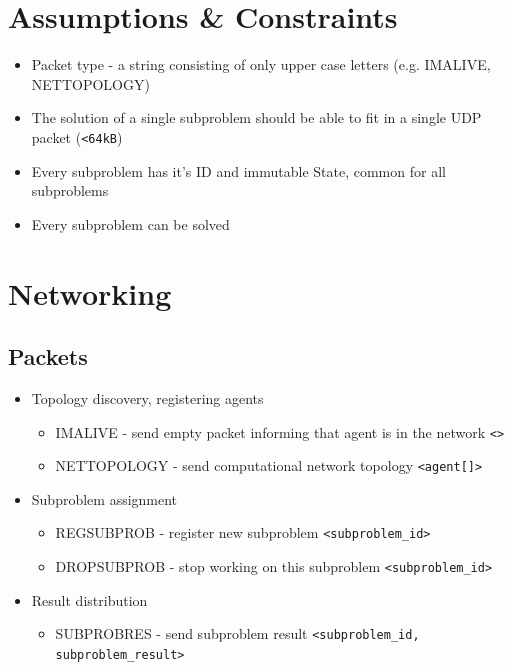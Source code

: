 \documentclass{article}
\begin{document}
\section{Assumptions \& Constraints}
\begin{itemize}
    \item Packet type - a string consisting of only upper case letters (e.g. IMALIVE, NETTOPOLOGY)
    \item The solution of a single subproblem should be able to fit in a single UDP packet (\verb!<64kB!)
    \item Every subproblem has it's ID and immutable State, common for all subproblems
    \item Every subproblem can be solved
\end{itemize}

\section{Networking}
\subsection{Packets}

\begin{itemize}
    \item Topology discovery, registering agents
    \begin{itemize}
        \item IMALIVE - send empty packet informing that agent is in the network \verb!<>!
        \item NETTOPOLOGY - send computational network topology \verb!<agent[]>!
    \end{itemize}
    \item Subproblem assignment
    \begin{itemize}
        \item REGSUBPROB - register new subproblem \verb!<subproblem_id>!
        \item DROPSUBPROB - stop working on this subproblem \verb!<subproblem_id>!
    \end{itemize}
    \item Result distribution
    \begin{itemize}
        \item SUBPROBRES - send subproblem result \verb!<subproblem_id, subproblem_result>!
    \end{itemize}
\end{itemize}
\end{document}
